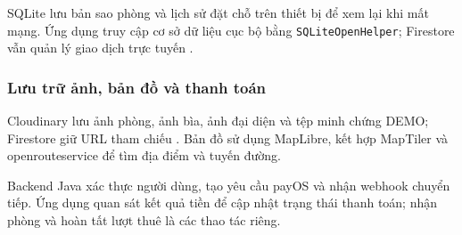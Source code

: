 SQLite lưu bản sao phòng và lịch sử đặt chỗ trên thiết bị để xem lại khi mất mạng. Ứng dụng truy cập cơ sở dữ liệu cục bộ bằng \texttt{SQLiteOpenHelper}; Firestore vẫn quản lý giao dịch trực tuyến \parencite{android_sqlite}.

\subsubsection{Lưu trữ ảnh, bản đồ và thanh toán}
Cloudinary lưu ảnh phòng, ảnh bìa, ảnh đại diện và tệp minh chứng DEMO; Firestore giữ URL tham chiếu \parencite{cloudinary_android}. Bản đồ sử dụng MapLibre, kết hợp MapTiler và openrouteservice để tìm địa điểm và tuyến đường.

Backend Java xác thực người dùng, tạo yêu cầu payOS và nhận webhook chuyển tiếp. Ứng dụng quan sát kết quả tiền để cập nhật trạng thái thanh toán; nhận phòng và hoàn tất lượt thuê là các thao tác riêng.
